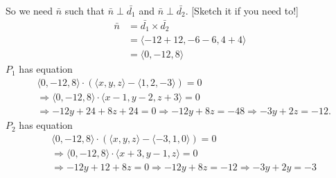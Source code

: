 \documentclass[11pt]{article}
\begin{document}
\begin{enumerate}[label=\alph*), series=Last]
    So we need \(\bar{n}\) such that \(\bar{n} \perp \bar{d_1}\) and \(\bar{n} \perp \bar{d_2}\). \hfill {\color{red} [Sketch it if you need to!]}
    \[
        \begin{aligned}
            \bar{n} &= \bar{d_1} \times \bar{d_2} \\
            &= \langle -12+12,-6-6,4+4 \rangle\\
            &= \langle 0, -12, 8 \rangle
        \end{aligned}
    \]
    \(P_1\) has equation
    \[
        \begin{aligned}
            &\langle 0, -12, 8 \rangle \cdot \left(\langle x,y,z\rangle - \langle 1,2,-3\rangle\right) = 0\\
            &\Rightarrow \langle 0, -12, 8 \rangle \cdot \langle x-1,y-2,z+3\rangle = 0\\
            &\Rightarrow -12y+24+8z+24 = 0 \Rightarrow -12y+8z = -48 \Rightarrow -3y + 2z = -12.
        \end{aligned}
    \]
    \(P_2\) has equation
    \[
        \begin{aligned}
            &\langle 0, -12, 8 \rangle \cdot \left(\langle x,y,z\rangle - \langle -3,1,0\rangle\right) = 0\\
            &\Rightarrow \langle 0, -12, 8 \rangle \cdot \langle x+3, y-1, z \rangle = 0\\
            &\Rightarrow -12y +12 +8z = 0 \Rightarrow -12y + 8z = -12 \Rightarrow -3y + 2y = -3
        \end{aligned}
    \]
    \color{black}
\end{enumerate}

\newpage
\end{document}
